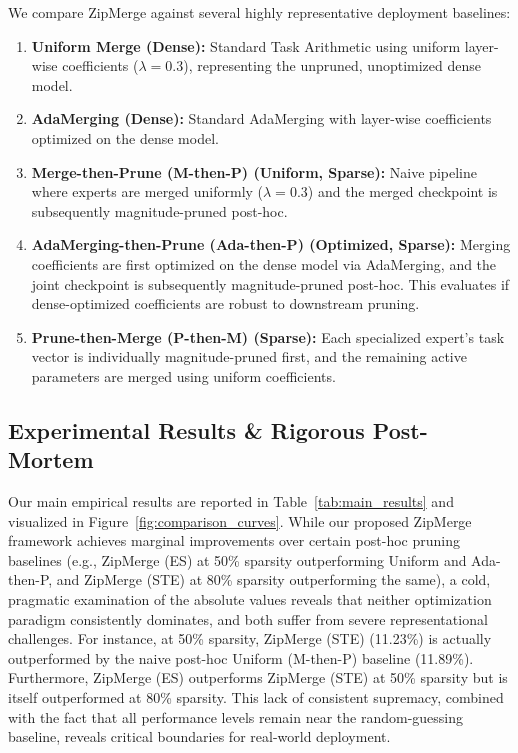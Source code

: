 We compare ZipMerge against several highly representative deployment baselines:
\begin{enumerate}[leftmargin=*]
    \item \textbf{Uniform Merge (Dense):} Standard Task Arithmetic \cite{ilharco2023editing} using uniform layer-wise coefficients ($\lambda = 0.3$), representing the unpruned, unoptimized dense model.
    \item \textbf{AdaMerging (Dense):} Standard AdaMerging \cite{yang2024adamerging} with layer-wise coefficients optimized on the dense model.
    \item \textbf{Merge-then-Prune (M-then-P) (Uniform, Sparse):} Naive pipeline where experts are merged uniformly ($\lambda = 0.3$) and the merged checkpoint is subsequently magnitude-pruned post-hoc.
    \item \textbf{AdaMerging-then-Prune (Ada-then-P) (Optimized, Sparse):} Merging coefficients are first optimized on the dense model via AdaMerging, and the joint checkpoint is subsequently magnitude-pruned post-hoc. This evaluates if dense-optimized coefficients are robust to downstream pruning.
    \item \textbf{Prune-then-Merge (P-then-M) (Sparse):} Each specialized expert's task vector is individually magnitude-pruned first, and the remaining active parameters are merged using uniform coefficients.
\end{enumerate}

\subsection{Experimental Results \& Rigorous Post-Mortem}

Our main empirical results are reported in Table~\ref{tab:main_results} and visualized in Figure~\ref{fig:comparison_curves}. While our proposed ZipMerge framework achieves marginal improvements over certain post-hoc pruning baselines (e.g., ZipMerge (ES) at 50\% sparsity outperforming Uniform and Ada-then-P, and ZipMerge (STE) at 80\% sparsity outperforming the same), a cold, pragmatic examination of the absolute values reveals that neither optimization paradigm consistently dominates, and both suffer from severe representational challenges. For instance, at 50\% sparsity, ZipMerge (STE) (11.23\%) is actually outperformed by the naive post-hoc Uniform (M-then-P) baseline (11.89\%). Furthermore, ZipMerge (ES) outperforms ZipMerge (STE) at 50\% sparsity but is itself outperformed at 80\% sparsity. This lack of consistent supremacy, combined with the fact that all performance levels remain near the random-guessing baseline, reveals critical boundaries for real-world deployment.

